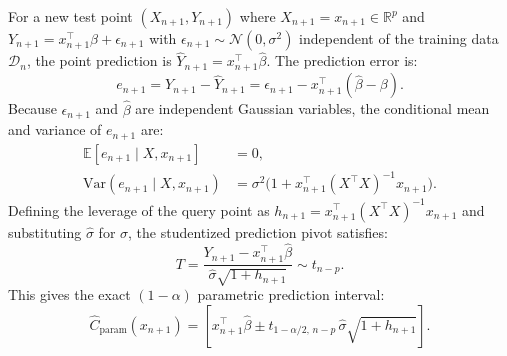 \documentclass[journal]{IEEEtran}
\begin{document}
For a new test point $(X_{n+1}, Y_{n+1})$ where $X_{n+1} = x_{n+1} \in \mathbb{R}^p$ and $Y_{n+1} = x_{n+1}^\top \beta + \epsilon_{n+1}$ with $\epsilon_{n+1} \sim \mathcal{N}(0, \sigma^2)$ independent of the training data $\mathcal{D}_n$, the point prediction is $\hat{Y}_{n+1} = x_{n+1}^\top \hat{\beta}$. The prediction error is:
\begin{equation}
e_{n+1} = Y_{n+1} - \hat{Y}_{n+1} = \epsilon_{n+1} - x_{n+1}^\top (\hat{\beta} - \beta).
\end{equation}
Because $\epsilon_{n+1}$ and $\hat{\beta}$ are independent Gaussian variables, the conditional mean and variance of $e_{n+1}$ are:
\begin{align}
\mathbb{E}[e_{n+1} \mid X, x_{n+1}] &= 0, \\
\text{Var}(e_{n+1} \mid X, x_{n+1}) &= \sigma^2 \Big(1 + x_{n+1}^\top (X^\top X)^{-1} x_{n+1}\Big).
\end{align}
Defining the leverage of the query point as $h_{n+1} = x_{n+1}^\top (X^\top X)^{-1} x_{n+1}$ and substituting $\hat{\sigma}$ for $\sigma$, the studentized prediction pivot satisfies:
\begin{equation}
T = \frac{Y_{n+1} - x_{n+1}^\top \hat{\beta}}{\hat{\sigma} \sqrt{1 + h_{n+1}}} \sim t_{n-p}.
\end{equation}
This gives the exact $(1 - \alpha)$ parametric prediction interval:
\begin{equation}
\hat{C}_{\text{param}}(x_{n+1}) = \left[ x_{n+1}^\top \hat{\beta} \pm t_{1-\alpha/2, \, n-p} \, \hat{\sigma} \sqrt{1 + h_{n+1}} \right].
\end{equation}
\end{document}
